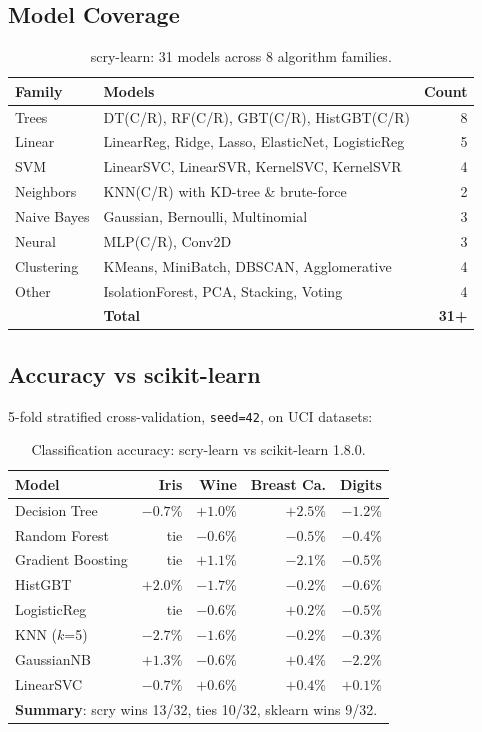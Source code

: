 \documentclass[11pt,a4paper]{article}
\begin{document}
\subsection{Model Coverage}

\begin{table}[H]
\centering
\caption{scry-learn: 31 models across 8 algorithm families.}
\small
\begin{tabular}{llr}
\toprule
\textbf{Family} & \textbf{Models} & \textbf{Count} \\
\midrule
Trees & DT(C/R), RF(C/R), GBT(C/R), HistGBT(C/R) & 8 \\
Linear & LinearReg, Ridge, Lasso, ElasticNet, LogisticReg & 5 \\
SVM & LinearSVC, LinearSVR, KernelSVC, KernelSVR & 4 \\
Neighbors & KNN(C/R) with KD-tree \& brute-force & 2 \\
Naive Bayes & Gaussian, Bernoulli, Multinomial & 3 \\
Neural & MLP(C/R), Conv2D & 3 \\
Clustering & KMeans, MiniBatch, DBSCAN, Agglomerative & 4 \\
Other & IsolationForest, PCA, Stacking, Voting & 4 \\
\midrule
& \textbf{Total} & \textbf{31+} \\
\bottomrule
\end{tabular}
\end{table}

\subsection{Accuracy vs scikit-learn}

5-fold stratified cross-validation, \texttt{seed=42}, on UCI datasets:

\begin{table}[H]
\centering
\caption{Classification accuracy: scry-learn vs scikit-learn 1.8.0.}
\small
\begin{tabular}{lrrrr}
\toprule
\textbf{Model} & \textbf{Iris} & \textbf{Wine} & \textbf{Breast Ca.} & \textbf{Digits} \\
\midrule
Decision Tree & $-0.7\%$ & $\mathbf{+1.0\%}$ & $\mathbf{+2.5\%}$ & $-1.2\%$ \\
Random Forest & tie & $-0.6\%$ & $-0.5\%$ & $-0.4\%$ \\
Gradient Boosting & tie & $\mathbf{+1.1\%}$ & $-2.1\%$ & $-0.5\%$ \\
HistGBT & $\mathbf{+2.0\%}$ & $-1.7\%$ & $-0.2\%$ & $-0.6\%$ \\
LogisticReg & tie & $-0.6\%$ & $\mathbf{+0.2\%}$ & $-0.5\%$ \\
KNN ($k$=5) & $-2.7\%$ & $-1.6\%$ & $-0.2\%$ & $-0.3\%$ \\
GaussianNB & $+1.3\%$ & $-0.6\%$ & $+0.4\%$ & $-2.2\%$ \\
LinearSVC & $-0.7\%$ & $\mathbf{+0.6\%}$ & $\mathbf{+0.4\%}$ & $\mathbf{+0.1\%}$ \\
\midrule
\multicolumn{5}{l}{\textbf{Summary}: scry wins 13/32, ties 10/32, sklearn wins 9/32.} \\
\bottomrule
\end{tabular}
\end{table}
\end{document}
